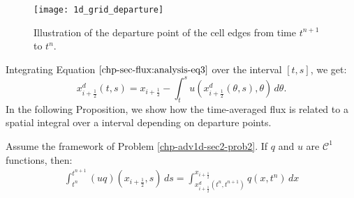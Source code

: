 \begin{figure}[!htb]
	\centering
	\texttt{[image: 1d\_grid\_departure]}
	\caption{Illustration of the departure point of the cell edges from time $t^{n+1}$ to $t^n$.\label{chp-adv1d-sec1-grid1d-dep}}
\end{figure}
Integrating Equation $\eqref{chp-sec-flux:analysis-eq3}$ over the interval
$[t,s]$, we get:
\begin{equation}
	\label{chp-sec-flux:analysis-eq4}
	x^d_{i+\frac{1}{2}} (t,s) = x_{i+\frac{1}{2}} - \int_{t}^{s}u(x^d_{i+\frac{1}{2}}(\theta,s),\theta)  \,d\theta.
\end{equation}
In the following Proposition, we show how the time-averaged flux is 
related to a spatial integral over a interval depending on departure points.
\begin{prop}
	\label{chp-adv1d-sec-flux:prop1}
	Assume the framework of Problem \ref{chp-adv1d-sec2-prob2}.
	If $q$ and $u$ are $\mathcal{C}^1$ functions, then:
	\begin{align}
		\label{chp-adv1d-sec-flux:approx1}
		\int_{t^n}^{t^{n+1}} (uq)(x_{i+\frac{1}{2}},s) \,ds = 
		\int^{x_{i+\frac{1}{2}}}_{x^d_{i+\frac{1}{2}}(t^n,t^{n+1})} q(x,t^n)\,dx
	\end{align}
\end{prop}
